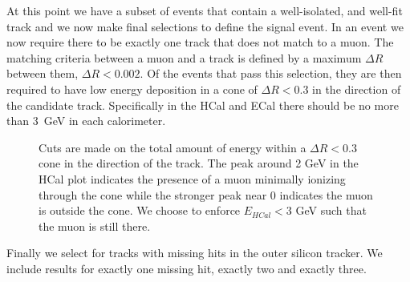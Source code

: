 \documentclass[a4paper,12pt]{article}
\begin{document}
        At this point we have a subset of events that contain a well-isolated,
        and well-fit track and we now make final selections to define the signal
        event.  In an event we now require there to be exactly one track that
        does not match to a muon. The matching criteria between a muon and a
        track is defined by a maximum $\Delta R$ between them, $\Delta R <
        0.002$. Of the events that pass this selection, they are then required
        to have low energy deposition in a cone of $\Delta R < 0.3$ in the
        direction of the candidate track. Specifically in the HCal and ECal
        there should be no more than 3~GeV in each calorimeter. 
        \begin{figure}[ht]%
            \centering
            \caption{Cuts are made on the total amount of energy within a
            $\Delta R < 0.3$ cone in the direction of the track. The peak around
            2 GeV in the HCal plot indicates the presence of a muon minimally
            ionizing through the cone while the stronger peak near 0 indicates
            the muon is outside the cone. We choose to enforce $E_{HCal} < 3$
            GeV such that the muon is still there.}
            \label{fig:calodep}
        \end{figure}
        Finally we select for tracks with missing hits in the outer silicon
        tracker. We include results for exactly one missing hit, exactly two and
        exactly three.
\end{document}
